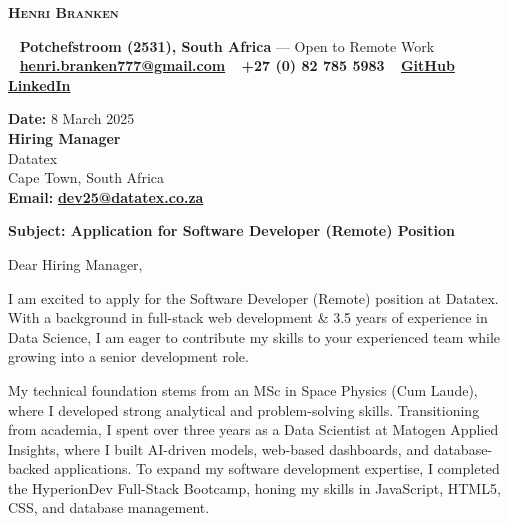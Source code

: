 \documentclass[a4paper,10pt]{article}
\begin{document}
	
	\begin{center}
		{\Huge\textbf{\textsc{\textcolor{burnt}{Henri Branken}}}}\\[0.5cm]
	\end{center}
	
	\begin{tcolorbox}[
		colback=teal!10,
		colframe=teal,
		boxrule=1pt,
		width=\textwidth,
		left=10pt, right=10pt,
		sharp corners=northwest
		]
		\begin{center}
			\faHome~ \textbf{Potchefstroom (2531), South Africa} --- Open to Remote Work \\
			\faEnvelope~ \href{mailto:henri.branken777@gmail.com}{\textbf{henri.branken777@gmail.com}} \quad
			\faPhone~ \textbf{+27 (0) 82 785 5983} \quad
			\faGithub~ \href{https://github.com/HenriBranken}{\textbf{GitHub}} \quad
			\faLinkedin~ \href{https://www.linkedin.com/in/henri-branken-1423a2153/}{\textbf{LinkedIn}}
		\end{center}
	\end{tcolorbox}
	
	\vspace{0.5cm}
	\noindent \textbf{Date:} 8 March 2025  \\
	\textbf{Hiring Manager}  \\
	Datatex  \\
	Cape Town, South Africa  \\
	\textbf{Email:} \href{mailto:dev25@datatex.co.za}{\textbf{dev25@datatex.co.za}}
	
	\vspace{0.5cm}
	\noindent \textbf{Subject: Application for Software Developer (Remote) Position}
	
	\vspace{0.5cm}
	\noindent Dear Hiring Manager,
	
	I am excited to apply for the Software Developer (Remote) position at Datatex. With a background in full-stack web development \& 3.5 years of experience in Data Science, I am eager to contribute my skills to your experienced team while growing into a senior development role.
	
	My technical foundation stems from an MSc in Space Physics (Cum Laude), where I developed strong analytical and problem-solving skills. Transitioning from academia, I spent over three years as a Data Scientist at Matogen Applied Insights, where I built AI-driven models, web-based dashboards, and database-backed applications. To expand my software development expertise, I completed the HyperionDev Full-Stack Bootcamp, honing my skills in JavaScript, HTML5, CSS, and database management.
	
\end{document}
